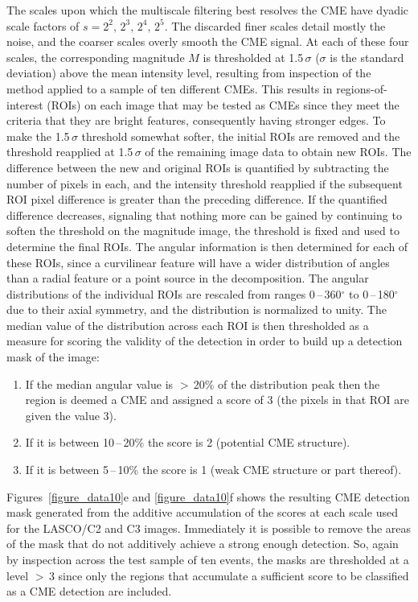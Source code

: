 \documentclass[preprint2]{aastex}
\begin{document}
The scales upon which the multiscale filtering best resolves the CME have dyadic scale factors of $s=2^{2},\,2^{3},\,2^{4},\,2^{5}$. The discarded finer scales detail mostly the noise, and the coarser scales overly smooth the CME signal. At each of these four scales, the corresponding magnitude $M$ is thresholded at 1.5\,$\sigma$ ($\sigma$ is the standard deviation) above the mean intensity level, resulting from inspection of the method applied to a sample of ten different CMEs. This results in regions-of-interest (ROIs) on each image that may be tested as CMEs since they meet the criteria that they are bright features, consequently having stronger edges. To make the 1.5\,$\sigma$ threshold somewhat softer, the initial ROIs are removed and the threshold reapplied at 1.5\,$\sigma$ of the remaining image data to obtain new ROIs. The difference between the new and original ROIs is quantified by subtracting the number of pixels in each, and the intensity threshold reapplied if the subsequent ROI pixel difference is greater than the preceding difference. If the quantified difference decreases, signaling that nothing more can be gained by continuing to soften the threshold on the magnitude image, the threshold is fixed and used to determine the final ROIs. The angular information is then determined for each of these ROIs, since a curvilinear feature will have a wider distribution of angles than a radial feature or a point source in the decomposition. The angular distributions of the individual ROIs are rescaled from ranges 0\,--\,360$^{\circ}$ to 0\,--\,180$^{\circ}$ due to their axial symmetry, and the distribution is normalized to unity. The median value of the distribution across each ROI is then thresholded as a measure for scoring the validity of the detection in order to build up a detection mask of the image:
\begin{enumerate}
\item If the median angular value is $>$\,20\% of the distribution peak then the region is deemed a CME and assigned a score of 3 (the pixels in that ROI are given the value 3).
\item If it is between 10\,--\,20\% the score is 2 (potential CME structure).
\item If it is between 5\,--\,10\% the score is 1 (weak CME structure or part thereof).
\end{enumerate}
Figures~\ref{figure_data10}e and \ref{figure_data10}f shows the resulting CME detection mask generated from the additive accumulation of the scores at each scale used for the LASCO/C2 and C3 images. Immediately it is possible to remove the areas of the mask that do not additively achieve a strong enough detection. So, again by inspection across the test sample of ten events, the masks are thresholded at a level $>$\,3 since only the regions that accumulate a sufficient score to be classified as a CME detection are included.
\end{document}
